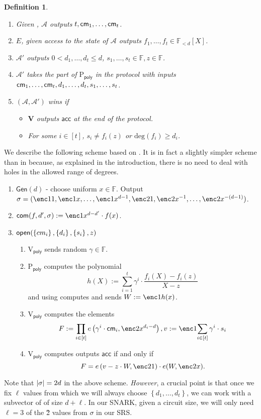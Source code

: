 \documentclass[11pt]{article}
\numberwithin{figure}{section} %
\newtheorem{dfn}[thm]{Definition}
\newcommand{\set}[1]{\ensuremath{\left\{#1\right\}}\xspace}
\newcommand{\F}{\ensuremath{\mathbb F}\xspace}
\newcommand{\adv}{\ensuremath{\mathcal A}\xspace}
\newcommand{\advprime}{\ensuremath{{\mathcal A}'}\xspace}
\renewcommand{\deg}{\ensuremath{\mathrm{deg}}\xspace}
\newcommand{\acc}{\ensuremath{\mathsf{acc}}\xspace}
\newcommand{\defeq}{:=}
\newcommand{\gen}{\ensuremath{\mathsf{Gen}}\xspace}
\newcommand{\prvpoly}{\ensuremath{\mathrm{P_{\mathsf{poly}}}}\xspace}
\newcommand{\verpoly}{\ensuremath{\mathrm{V_{\mathsf{poly}}}}\xspace}
\newcommand{\ver}{\ensuremath{\mathsf{\mathbf{V}}}\xspace}
\newcommand{\ext}{\ensuremath{E}\xspace}
\newcommand{\polysofdeg}[1]{\ensuremath{\F_{< #1}[X]}\xspace}
\begin{document}
\begin{dfn}
\begin{itemize}
 \begin{enumerate}
  \item Given \srs, \adv outputs $t,\mathsf{cm}_1,\ldots,\mathsf{cm}_t$.
  \item \ext, given access to the state of \adv outputs $f_1,\ldots,f_t \in \polysofdeg{d}$.
  \item \advprime outputs $0< d_1,\ldots,d_t \leq d$, $s_1,\ldots,s_t \in \F,z \in \F$.
  \item \advprime takes the part of \prvpoly in the protocol \open with inputs
  $\mathsf{cm}_1,\ldots,\mathsf{cm}_t,d_1,\ldots,d_t,s_1,\ldots,s_t$.
  \item $(\adv,\advprime)$ wins if 
  \begin{itemize}
   \item \ver outputs \acc at the end of the protocol.
   \item For some $i\in [t]$, $s_i\neq f_i(z)$ or $\deg(f_i)\geq d_i$.
  \end{itemize}

 \end{enumerate}

\end{itemize}
\end{dfn}
We describe the following scheme based on \cite{kate,sonic}.
It is in fact a slightly simpler scheme than in \cite{sonic} because, as explained in the introduction, there is no need to deal with holes in the allowed range of degrees.
\begin{enumerate}
 \item $\gen(d)$ - choose uniform $x\in \F$. Output $\srs =(\enc1{1},\enc1{x},\ldots,\enc1{x^{d-1}},\enc2{1},\enc2{x^{-1}},\ldots,\enc2{x^{-(d-1)}})$.
 \item $\com(f,d',\srs) \defeq \enc1{x^{d-d'}\cdot f(x)}$.
 \item $\open(\set{cm_i},\set{d_i},\set{s_i},z)$
 \begin{enumerate}
  \item \verpoly sends random $\gamma\in \F$.
 \item \prvpoly computes the polynomial
 \[h(X)\defeq \sum_{i=1}^t \gamma^{i}\cdot \frac{f_i(X)-f_i(z)}{X-z}  \]
 and using \srs computes and sends $W\defeq \enc1{h(x)}$.
 \item\label{step:computeW} \verpoly computes the elements 
 \[F\defeq \prod_{i\in [t]}e\left(\gamma^{i} \cdot \cm_i, \enc2{x^{d_i-d}} \right), v\defeq \enc1{\sum_{i\in [t]} \gamma^{i}\cdot s_i}\]
 \item \verpoly computes outputs \acc if and only if
 \[ F= e\left(v- z\cdot W,\enc2{1}\right )\cdot e(W,\enc2{x} ). \]
 \end{enumerate}

\end{enumerate}
Note that $|\sigma| = 2d$ in the above scheme.
\emph{However}, a crucial point is that once we fix $\ell$ values from which we will always choose \set{d_1,\ldots,d_t},
we can work with a subvector of \srs of size $d+\ell$. In our SNARK, given a circuit size, we will only need $\ell=3$ of the \G2 values from $\sigma$ in our SRS.
\end{document}

